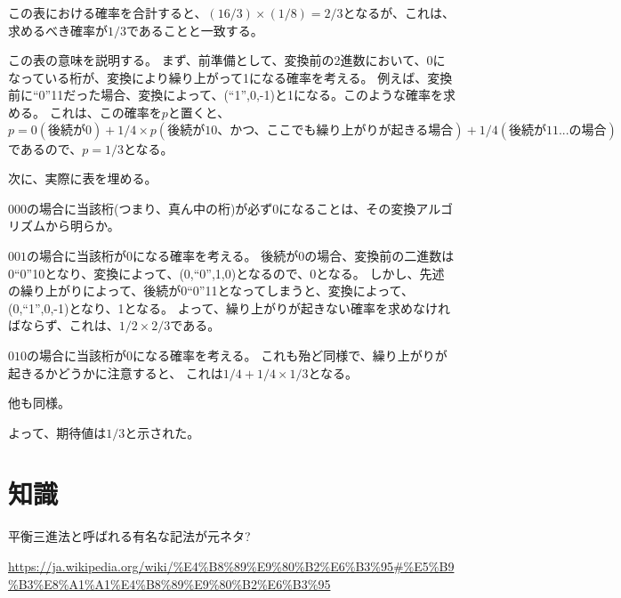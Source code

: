 \documentclass[a4paper, 10pt, dvipdfmx]{jlreq}
\begin{document}
この表における確率を合計すると、$(16/3)\times(1/8)=2/3$となるが、これは、求めるべき確率が$1/3$であることと一致する。

この表の意味を説明する。
まず、前準備として、変換前の2進数において、0になっている桁が、変換により繰り上がって1になる確率を考える。
例えば、変換前に``0''11だった場合、変換によって、(``1'',0,-1)と1になる。このような確率を求める。
これは、この確率を$p$と置くと、$p=0(\text{後続が0})+1/4 \times p(\text{後続が10、かつ、ここでも繰り上がりが起きる場合})+1/4(\text{後続が11...}の場合)$
であるので、$p=1/3$となる。

次に、実際に表を埋める。

$000$の場合に当該桁(つまり、真ん中の桁)が必ず0になることは、その変換アルゴリズムから明らか。

$001$の場合に当該桁が0になる確率を考える。
後続が0の場合、変換前の二進数は0``0''10となり、変換によって、(0,``0'',1,0)となるので、0となる。
しかし、先述の繰り上がりによって、後続が0``0''11となってしまうと、変換によって、(0,``1'',0,-1)となり、1となる。
よって、繰り上がりが起きない確率を求めなければならず、これは、$1/2 \times 2/3$である。

$010$の場合に当該桁が0になる確率を考える。
これも殆ど同様で、繰り上がりが起きるかどうかに注意すると、
これは$1/4+1/4 \times 1/3$となる。

他も同様。

よって、期待値は$1/3$と示された。

\section{知識}

平衡三進法と呼ばれる有名な記法が元ネタ?

\url{https://ja.wikipedia.org/wiki/%E4%B8%89%E9%80%B2%E6%B3%95#%E5%B9%B3%E8%A1%A1%E4%B8%89%E9%80%B2%E6%B3%95}
\end{document}
